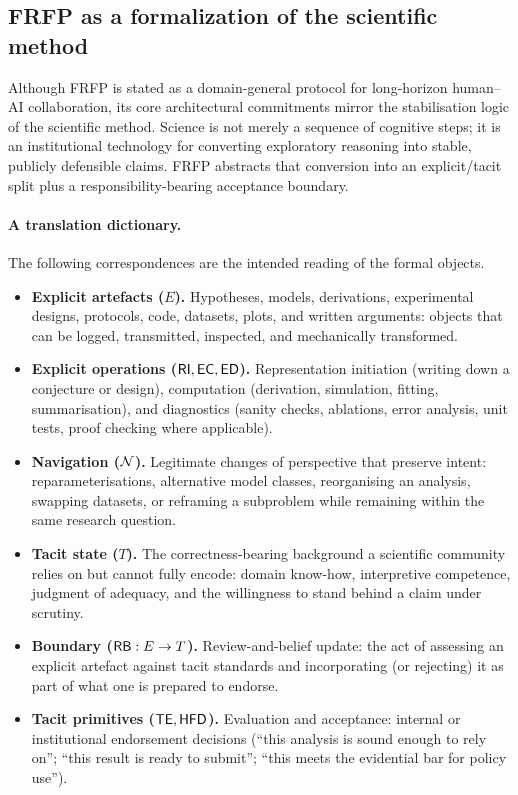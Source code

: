 \subsection{FRFP as a formalization of the scientific method}
\label{subsec:frfp-scientific-method}

Although FRFP is stated as a domain-general protocol for long-horizon human--AI collaboration, its core architectural commitments mirror the stabilisation logic of the scientific method. Science is not merely a sequence of cognitive steps; it is an institutional technology for converting exploratory reasoning into stable, publicly defensible claims. FRFP abstracts that conversion into an explicit/tacit split plus a responsibility-bearing acceptance boundary.

\paragraph{A translation dictionary.}
The following correspondences are the intended reading of the formal objects.
\begin{itemize}[leftmargin=2em]
  \item \textbf{Explicit artefacts (\(E\)).} Hypotheses, models, derivations, experimental designs, protocols, code, datasets, plots, and written arguments: objects that can be logged, transmitted, inspected, and mechanically transformed.
  \item \textbf{Explicit operations (\(\mathsf{RI},\mathsf{EC},\mathsf{ED}\)).} Representation initiation (writing down a conjecture or design), computation (derivation, simulation, fitting, summarisation), and diagnostics (sanity checks, ablations, error analysis, unit tests, proof checking where applicable).
  \item \textbf{Navigation (\(\mathcal{N}\)).} Legitimate changes of perspective that preserve intent: reparameterisations, alternative model classes, reorganising an analysis, swapping datasets, or reframing a subproblem while remaining within the same research question.
  \item \textbf{Tacit state (\(T\)).} The correctness-bearing background a scientific community relies on but cannot fully encode: domain know-how, interpretive competence, judgment of adequacy, and the willingness to stand behind a claim under scrutiny.
  \item \textbf{Boundary (\(\mathsf{RB}:E\to T\)).} Review-and-belief update: the act of assessing an explicit artefact against tacit standards and incorporating (or rejecting) it as part of what one is prepared to endorse.
  \item \textbf{Tacit primitives (\(\mathsf{TE},\mathsf{HFD}\)).} Evaluation and acceptance: internal or institutional endorsement decisions (``this analysis is sound enough to rely on''; ``this result is ready to submit''; ``this meets the evidential bar for policy use'').
\end{itemize}

